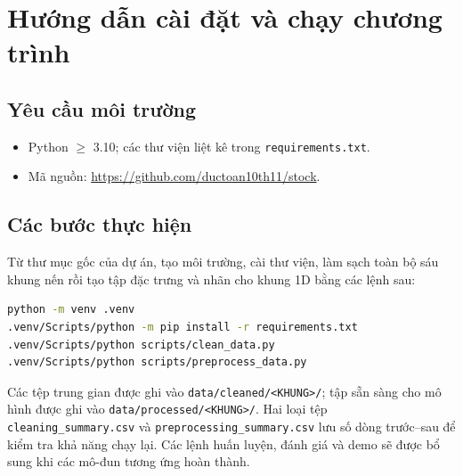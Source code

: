 \documentclass[12pt,a4paper,oneside]{report}
\begin{document}
\appendix
\renewcommand{\bmchapname}{Phụ lục}

\chapter{Hướng dẫn cài đặt và chạy chương trình}
\label{pl:huongdan}

\section{Yêu cầu môi trường}
\begin{itemize}
  \item Python $\geq$ 3.10; các thư viện liệt kê trong \texttt{requirements.txt}.
  \item Mã nguồn: \url{https://github.com/ductoan10th11/stock}.
\end{itemize}

\section{Các bước thực hiện}
Từ thư mục gốc của dự án, tạo môi trường, cài thư viện, làm sạch toàn bộ sáu
khung nến rồi tạo tập đặc trưng và nhãn cho khung 1D bằng các lệnh sau:

\begin{lstlisting}[language=bash,numbers=none]
python -m venv .venv
.venv/Scripts/python -m pip install -r requirements.txt
.venv/Scripts/python scripts/clean_data.py
.venv/Scripts/python scripts/preprocess_data.py
\end{lstlisting}

Các tệp trung gian được ghi vào \texttt{data/cleaned/<KHUNG>/}; tập sẵn sàng
cho mô hình được ghi vào \texttt{data/processed/<KHUNG>/}. Hai loại tệp
\texttt{cleaning\_summary.csv} và \texttt{preprocessing\_summary.csv} lưu số
dòng trước--sau để kiểm tra khả năng chạy lại. Các lệnh huấn luyện, đánh giá và
demo sẽ được bổ sung khi các mô-đun tương ứng hoàn thành.
\end{document}
